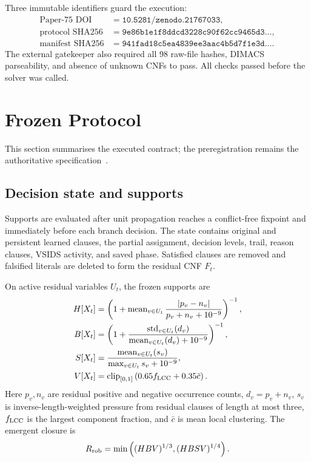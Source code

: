 \documentclass[11pt,a4paper]{article}
\newcommand{\Rrob}{R_{\rm rob}}
\begin{document}
Three immutable identifiers guard the execution:
\begin{align*}
\text{Paper-75 DOI}&=\texttt{10.5281/zenodo.21767033},\\
\text{protocol SHA256}&=\texttt{9e86b1e1f8ddcd3228c90f62cc9465d3}\ldots,\\
\text{manifest SHA256}&=\texttt{941fad18c5ea4839ee3aac4b5d7f1e3d}\ldots.
\end{align*}
The external gatekeeper also required all 98 raw-file hashes, DIMACS
parseability, and absence of unknown CNFs to pass.  All checks passed before
the solver was called.

\section{Frozen Protocol}

This section summarises the executed contract; the preregistration remains the
authoritative specification~\cite{krieg75}.

\subsection{Decision state and supports}

Supports are evaluated after unit propagation reaches a conflict-free fixpoint
and immediately before each branch decision.  The state contains original and
persistent learned clauses, the partial assignment, decision levels, trail,
reason clauses, VSIDS activity, and saved phase.  Satisfied clauses are removed
and falsified literals are deleted to form the residual CNF $F_t$.

On active residual variables $U_t$, the frozen supports are
\begin{align}
H[X_t]&=\left(1+\operatorname{mean}_{v\in U_t}
\frac{|p_v-n_v|}{p_v+n_v+10^{-9}}\right)^{-1},\\
B[X_t]&=\left(1+\frac{\operatorname{std}_{v\in U_t}(d_v)}
{\operatorname{mean}_{v\in U_t}(d_v)+10^{-9}}\right)^{-1},\\
S[X_t]&=\frac{\operatorname{mean}_{v\in U_t}(s_v)}
{\max_{v\in U_t}s_v+10^{-9}},\\
V[X_t]&=\operatorname{clip}_{[0,1]}
\left(0.65f_{\rm LCC}+0.35\bar c\right).
\end{align}
Here $p_v,n_v$ are residual positive and negative occurrence counts,
$d_v=p_v+n_v$, $s_v$ is inverse-length-weighted pressure from residual
clauses of length at most three, $f_{\rm LCC}$ is the largest component
fraction, and $\bar c$ is mean local clustering.  The emergent closure is
\begin{equation}
\Rrob=\min\left((HBV)^{1/3},(HBSV)^{1/4}\right).
\end{equation}
\end{document}
